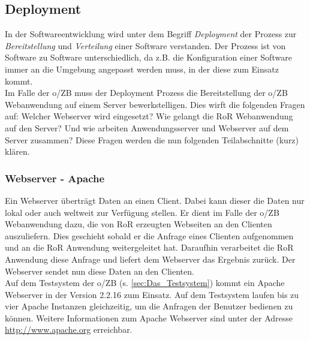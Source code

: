 \documentclass[12pt,             %
               a4paper,          %
               listof=totoc,     %
               index=totoc,      %
               bibliography=totoc,%
               oneside,         %
               BCOR1cm,          %
               english   %
               ]{scrbook}
\begin{document}
\subsection{Deployment}\label{sec:deployment}
In der Softwareentwicklung wird unter dem Begriff \textit{Deployment} der Prozess zur \textit{Bereitstellung} und \textit{Verteilung} einer Software verstanden. Der Prozess ist von Software zu Software unterschiedlich, da z.B. die Konfiguration einer Software immer an die Umgebung angepasst werden muss, in der diese zum Einsatz kommt.\\

Im Falle der o/ZB muss der Deployment Prozess die Bereitstellung der o/ZB Webanwendung auf einem Server bewerkstelligen. Dies wirft die folgenden Fragen auf: Welcher Webserver wird eingesetzt? Wie gelangt die RoR Webanwendung auf den Server? Und wie arbeiten Anwendungsserver und Webserver auf dem Server zusammen? Diese Fragen werden die nun folgenden Teilabschnitte (kurz) klären.

\subsubsection{Webserver - Apache}
Ein Webserver überträgt Daten an einen Client. Dabei kann dieser die Daten nur lokal oder auch weltweit zur Verfügung stellen. Er dient im Falle der o/ZB Webanwendung dazu, die von RoR erzeugten Webseiten an den Clienten auszuliefern. Dies geschieht sobald er die Anfrage eines Clienten aufgenommen und an die RoR Anwendung weitergeleitet hat. Daraufhin verarbeitet die RoR Anwendung diese Anfrage und liefert dem Webserver das Ergebnis zurück. Der Webserver sendet nun diese Daten an den Clienten.\\

Auf dem Testsystem der o/ZB (s. \vref{sec:Das_Testsystem}) kommt ein Apache Webserver in der Version 2.2.16 zum Einsatz. Auf dem Testsystem laufen bis zu vier Apache Instanzen gleichzeitig, um die Anfragen der Benutzer bedienen zu können. Weitere Informationen zum Apache Webserver sind unter der Adresse \url{http://www.apache.org} erreichbar.
\end{document}
